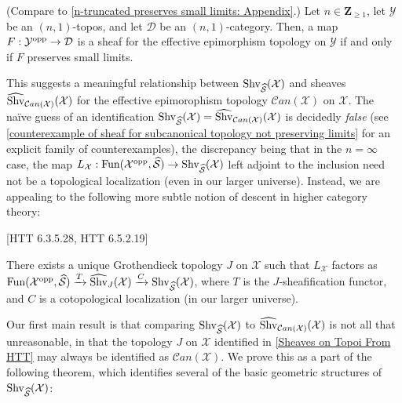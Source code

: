 \documentclass[10pt]{article}
\newcommand{\mS}{\mathcal S}
\newcommand{\C}{\mathcal C}
\newcommand{\cD}{\mathcal{D}}
\newcommand{\cX}{\mathcal{X}}
\newcommand{\cY}{\mathcal{Y}}
\newcommand{\ZZ}{\mathbb{Z}}
\def\ZZ{{\mathbf Z}}
\theoremstyle{witharg}
\theoremstyle{witharg}
\theoremstyle{witharg2}
\begin{document}
\begin{proposition}{}\label{n-truncated preserves small limits: Intro}

    (Compare to \ref{n-truncated preserves small limits: Appendix}.) Let $n\in \ZZ_{\geq 1}$, let $\cY$ be an $(n,1)$-topos, and let $\cD$ be an $(n,1)$-category. Then, a map $F:\cY^{\textnormal{opp}}\rightarrow \cD$ is a sheaf for the effective epimorphism topology on $\cY$ if and only if $F$ preserves small limits.

\end{proposition}

\noindent This suggests a meaningful relationship between $\textnormal{Shv}_{\widehat{\mS}}(\cX)$ and sheaves $\widehat{\textnormal{Shv}}_{\C an(\cX)}(\cX)$ for the effective epimorophism topology $\C an(\cX)$ on $\cX$. The na\"{i}ve guess of an identification $\textnormal{Shv}_{\widehat{\mS}}(\cX)=\widehat{\textnormal{Shv}}_{\C an(\cX)}(\cX)$ is decidedly \emph{false} (see \ref{counterexample of sheaf for subcanonical topology not preserving limits} for an explicit family of counterexamples), the discrepancy being that in the $n=\infty$ case, the map $L_\cX:\textnormal{Fun}(\cX^{\textnormal{opp}},\widehat{\mS})\rightarrow \textnormal{Shv}_{\widehat{\mS}}(\cX)$ left adjoint to the inclusion need not be a topological localization (even in our larger universe). Instead, we are appealing to the following more subtle notion of descent in higher category theory: 

\begin{proposition}{}[HTT 6.3.5.28, HTT 6.5.2.19]\label{Sheaves on Topoi From HTT}

    There exists a unique Grothendieck topology $J$ on $\cX$ such that $L_\cX$ factors as $\textnormal{Fun}(\cX^{\textnormal{opp}},\widehat{\mS})\xrightarrow{T}\widehat{\textnormal{Shv}}_J(\cX)\xrightarrow{C}\textnormal{Shv}_{\widehat{\mS}}(\cX)$, where $T$ is the $J$-sheafification functor, and $C$ is a cotopological localization (in our larger universe). 
  
    
\end{proposition}  

Our first main result is that comparing $\textnormal{Shv}_{\widehat{\mS}}(\cX)$ to $\widehat{\textnormal{Shv}}_{\C an(\cX)}(\cX)$ is not all that unreasonable, in that the topology $J$ on $\cX$ identified in \ref{Sheaves on Topoi From HTT} may always be identified as $\C an (\cX)$. We prove this as a part of the following theorem, which identifies several of the basic geometric structures of $\textnormal{Shv}_{\widehat{\mS}}(\cX)$: 
\end{document}
